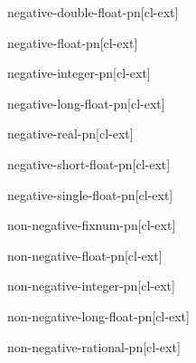 \documentclass[10pt,english]{book}
\begin{document}
\begin{function}{negative-double-float-p}{n}[cl-ext]
  
\end{function}

\begin{function}{negative-float-p}{n}[cl-ext]
  
\end{function}

\begin{function}{negative-integer-p}{n}[cl-ext]
  
\end{function}

\begin{function}{negative-long-float-p}{n}[cl-ext]
  
\end{function}

\begin{function}{negative-real-p}{n}[cl-ext]
  
\end{function}

\begin{function}{negative-short-float-p}{n}[cl-ext]
  
\end{function}

\begin{function}{negative-single-float-p}{n}[cl-ext]
  
\end{function}

\begin{function}{non-negative-fixnum-p}{n}[cl-ext]
  
\end{function}

\begin{function}{non-negative-float-p}{n}[cl-ext]
  
\end{function}

\begin{function}{non-negative-integer-p}{n}[cl-ext]
  
\end{function}

\begin{function}{non-negative-long-float-p}{n}[cl-ext]
  
\end{function}

\begin{function}{non-negative-rational-p}{n}[cl-ext]
  
\end{function}
\end{document}
